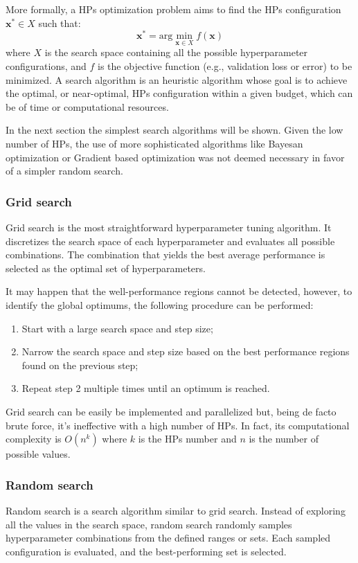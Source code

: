 \noindent
More formally, a HPs optimization problem aims to find the HPs configuration $\bm{x}^* \in X$ such that:
$$ \bm{x}^* = \text{arg}\underset{\bm{x}\in X}{\min}f(\bm{x}) $$
where $X$ is the search space containing all the possible hyperparameter configurations, and $f$ is the
objective function (e.g., validation loss or error) to be minimized. A search algorithm is an heuristic algorithm
whose goal is to achieve the optimal, or near-optimal, HPs configuration within a given budget, which can be of
time or computational resources.

In the next section the simplest search algorithms will be shown. Given the low number of HPs, the use of more
sophisticated algorithms like Bayesan optimization or Gradient based optimization was not deemed necessary
in favor of a simpler random search.

\subsubsection{Grid search}
Grid search is the most straightforward hyperparameter tuning algorithm. It discretizes the search space of each
hyperparameter and evaluates all possible combinations. The combination that yields the best average performance 
is selected as the optimal set of hyperparameters.

It may happen that the well-performance regions cannot be detected, however, to identify the global optimums, the following procedure can be performed:
\begin{enumerate}
    \item Start with a large search space and step size;
    \item Narrow the search space and step size based on the best performance regions found on the previous step;
    \item Repeat step 2 multiple times until an optimum is reached.
\end{enumerate}

Grid search can be easily be implemented and parallelized but, being de facto brute force, it's ineffective with
a high number of HPs. In fact, its computational complexity is $O(n^k)$ where $k$ is the HPs number and $n$ is the
number of possible values.

\subsubsection{Random search}
Random search is a search algorithm similar to grid search. Instead of exploring all the values in the search 
space, random search randomly samples hyperparameter combinations from the defined ranges or sets. Each sampled 
configuration is evaluated, and the best-performing set is selected.


